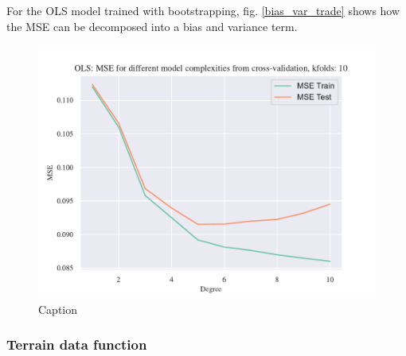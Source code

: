 For the OLS model trained with bootstrapping, fig. \ref{bias_var_trade} shows how the MSE can be decomposed into a bias and variance term. 

\begin{figure}[h!]
    \centering
    \includegraphics[width=1\linewidth]{project_1_alt/figures/data/OLS_MSE_Franke_Noise_CV_k10.pdf}
    \caption{Caption}
    \label{fig:frankek10}
\end{figure}


\subsubsection{Terrain data function}





